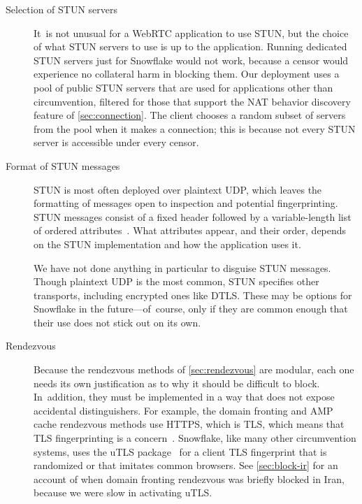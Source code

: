\documentclass[letterpaper,twocolumn]{article}
\begin{document}
\begin{description}
\item[Selection of STUN servers]
It~is not unusual for a WebRTC application to use STUN,
but the choice of what STUN servers to use is up to the application.
Running dedicated STUN servers just for Snowflake would not work,
because a censor would experience no collateral harm in
blocking them.
Our deployment uses a pool of public STUN servers
that are used for applications other than circumvention,
filtered for those that support the NAT behavior discovery feature
of \autoref{sec:connection}.
The client chooses a random subset of servers from the pool
when it makes a connection;
this is because not every STUN server is accessible
under every censor.

\item[Format of STUN messages]
STUN is most often deployed over plaintext UDP,
which leaves the formatting of messages open to inspection
and potential fingerprinting.
STUN messages consist of a fixed header
followed by a variable-length list of ordered
attributes~\cite[\S 5]{rfc8489}.
What attributes appear,
and their order,
depends on the STUN implementation
and how the application uses it.

We have not done anything in particular
to disguise STUN messages.
Though plaintext UDP is the most common,
STUN specifies other transports,
including encrypted ones like DTLS.
These may be options for Snowflake in the future---of~course,
only if they are common enough that their use
does not stick out on its own.

\item[Rendezvous]
Because the rendezvous methods of
\autoref{sec:rendezvous}
are modular,
each one needs its own justification
as to why it should be difficult to block.
In~addition, they must be implemented in a way
that does not expose accidental distinguishers.
For example, the domain fronting and AMP cache rendezvous methods
use HTTPS, which is TLS,
which means that TLS fingerprinting is a concern~\cite[\S 5.1]{Fifield2015a}.
Snowflake, like many other circumvention systems,
uses the uTLS package~\cite[\S VII]{Frolov2019a}
for a client TLS fingerprint that is randomized or that imitates common browsers.
See \autoref{sec:block-ir} for an account of when
domain fronting rendezvous was briefly blocked in Iran,
because we were slow in activating uTLS.


\end{description}
\end{document}
